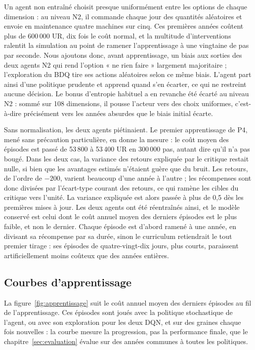 Un agent non entraîné choisit presque uniformément entre les options de chaque dimension : au niveau N2, il commande chaque jour des quantités aléatoires et envoie en maintenance quatre machines sur cinq. Ces premières années coûtent plus de 600\,000 UR, dix fois le coût normal, et la multitude d'interventions ralentit la simulation au point de ramener l'apprentissage à une vingtaine de pas par seconde. Nous ajoutons donc, avant apprentissage, un biais aux sorties des deux agents N2 qui rend l'option « ne rien faire » largement majoritaire ; l'exploration du BDQ tire ses actions aléatoires selon ce même biais. L'agent part ainsi d'une politique prudente et apprend quand s'en écarter, ce qui ne restreint aucune décision. Le bonus d'entropie habituel a en revanche été écarté au niveau N2 : sommé sur 108 dimensions, il pousse l'acteur vers des choix uniformes, c'est-à-dire précisément vers les années absurdes que le biais initial écarte.

Sans normalisation, les deux agents piétinaient. Le premier apprentissage de P4, mené sans précaution particulière, en donne la mesure : le coût moyen des épisodes est passé de 53\,800 à 53\,400 UR en 300\,000 pas, autant dire qu'il n'a pas bougé. Dans les deux cas, la variance des retours expliquée par le critique restait nulle, si bien que les avantages estimés n'étaient guère que du bruit. Les retours, de l'ordre de $-200$, varient beaucoup d'une année à l'autre ; les récompenses sont donc divisées par l'écart-type courant des retours, ce qui ramène les cibles du critique vers l'unité. La variance expliquée est alors passée à plus de 0,5 dès les premières mises à jour. Les deux agents ont été réentraînés ainsi, et le modèle conservé est celui dont le coût annuel moyen des derniers épisodes est le plus faible, et non le dernier. Chaque épisode est d'abord ramené à une année, en divisant sa récompense par sa durée, sinon le curriculum retiendrait le tout premier tirage : ses épisodes de quatre-vingt-dix jours, plus courts, paraissent artificiellement moins coûteux que des années entières.

\subsection{Courbes d'apprentissage}

La figure~\ref{fig:apprentissage} suit le coût annuel moyen des derniers épisodes au fil de l'apprentissage. Ces épisodes sont joués avec la politique stochastique de l'agent, ou avec son exploration pour les deux DQN, et sur des graines chaque fois nouvelles : la courbe mesure la progression, pas la performance finale, que le chapitre~\ref{sec:evaluation} évalue sur des années communes à toutes les politiques.

